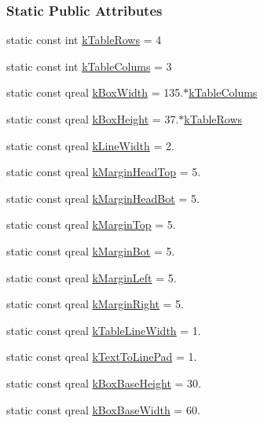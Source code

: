 \subsubsection*{Static Public Attributes}
\begin{DoxyCompactItemize}
\item 
static const int \hyperlink{class_info_bar_ad54d2dd19a63caf9d2476aace60ae3c5}{k\+Table\+Rows} = 4
\item 
static const int \hyperlink{class_info_bar_a57e9e7c40a6fd2a56dd47a4512d65489}{k\+Table\+Colums} = 3
\item 
static const qreal \hyperlink{class_info_bar_aa1c35ddbae0324743d90721037447571}{k\+Box\+Width} = 135.$\ast$\hyperlink{class_info_bar_a57e9e7c40a6fd2a56dd47a4512d65489}{k\+Table\+Colums}
\item 
static const qreal \hyperlink{class_info_bar_aba381a3838a5e064f1372f2f2b4d8e0d}{k\+Box\+Height} = 37.$\ast$\hyperlink{class_info_bar_ad54d2dd19a63caf9d2476aace60ae3c5}{k\+Table\+Rows}
\item 
static const qreal \hyperlink{class_info_bar_a46d929f42476a6ad37422adee1783712}{k\+Line\+Width} = 2.
\item 
static const qreal \hyperlink{class_info_bar_ae24b5cac460550a4c86203a3dbd96ba9}{k\+Margin\+Head\+Top} = 5.
\item 
static const qreal \hyperlink{class_info_bar_a0cfbafbc9f780fc1366157b9c8379463}{k\+Margin\+Head\+Bot} = 5.
\item 
static const qreal \hyperlink{class_info_bar_add145842c6a2331a7edf9e5be301e5b4}{k\+Margin\+Top} = 5.
\item 
static const qreal \hyperlink{class_info_bar_a67eb740893ed91c75f237cee756648cc}{k\+Margin\+Bot} = 5.
\item 
static const qreal \hyperlink{class_info_bar_a3c7688259f189cb28c2682f50a59335a}{k\+Margin\+Left} = 5.
\item 
static const qreal \hyperlink{class_info_bar_a2ce020e319adf3de887bf17e803887a3}{k\+Margin\+Right} = 5.
\item 
static const qreal \hyperlink{class_info_bar_a8d9aadb8292b5884eb1c02e18d36d073}{k\+Table\+Line\+Width} = 1.
\item 
static const qreal \hyperlink{class_info_bar_a8455611d11236c2d5cbd42414450e6e2}{k\+Text\+To\+Line\+Pad} = 1.
\item 
static const qreal \hyperlink{class_info_bar_a28fb5e5d6d399d9327f67aa768d4a3d8}{k\+Box\+Base\+Height} = 30.
\item 
static const qreal \hyperlink{class_info_bar_acb9c812df3577ae628cec2e149c9dd0a}{k\+Box\+Base\+Width} = 60.
\end{DoxyCompactItemize}
